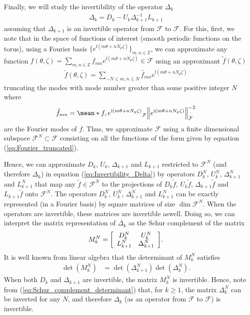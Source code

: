 Finally, we will study the invertibility of the operator $\Delta_k$ 
%
\begin{align}
	\Delta_{k} = D_k - U_k \Delta_{k+1}^{-1} L_{k+1} 
\label{eq:Invertibility_Delta}
\end{align}
assuming that $\Delta_{k+1}$ is an invertible operator from $\mathcal{F}$ to $\mathcal{F}$. For this, first, we note that in the space of functions of interest (smooth periodic functions on the torus), using a Fourier basis $\{e^{\ii (m \theta+ nN_p\zeta)}\}_{m,n\in\mathbb{Z}}$, we can approximate any function $f(\theta,\zeta)=\sum_{m,n\in \mathbb{Z}} \hat{f}_{mn} e^{\ii (m \theta+ nN_p\zeta)} \in \mathcal{F}$ using an approximant $\tilde{f}(\theta,\zeta)$
%
\begin{align}
	\tilde{f}(\theta,\zeta)=\sum_{- N \le m,n\le N } \hat{f}_{mn} e^{\ii (m \theta+ nN_p\zeta)}
\label{eq:Fourier_truncated}
\end{align}
truncating the modes with mode number greater than some positive integer $N $ where 
\begin{align}
	\hat{f}_{mn} = \mean*{f,e^{\ii (m \theta+ nN_p\zeta)}}_{\mathcal{F}}  \norm{e^{\ii (m \theta+ nN_p\zeta)}}_{\mathcal{F}}^{-2}
\end{align}
 are the Fourier modes of $f$. Thus, we approximate $\mathcal{F}$ using a finite dimensional subspace $\mathcal{F}^{N} \subset \mathcal{F}$ consisting on all the functions of the form given by equation (\ref{eq:Fourier_truncated}).
 
 
 Hence, we can approximate $D_k$, $U_k$, $\Delta_{k+1}$ and $L_{k+1} $ restricted to $\mathcal{F}^{N}$ (and therefore $\Delta_{k}$) in equation (\ref{eq:Invertibility_Delta}) by operators $D_k^N$, $U_k^N$, $\Delta_{k+1}^N$ and $L_{k+1}^N$ that map any $\tilde{f}\in\mathcal{F}^N$ to the projections of $D_k \tilde{f}$, $U_k \tilde{f}$, $\Delta_{k+1} \tilde{f}$ and $L_{k+1} \tilde{f}$ onto $\mathcal{F}^N$. The operators $D_k^N$, $U_k^N$, $\Delta_{k+1}^N$ and $L_{k+1}^N$ can be exactly represented (in a Fourier basis) by square matrices of size $\dim \mathcal{F}^N$. When the operators are invertible, these matrices are invertible aswell. Doing so, we can interpret the matrix representation of $\Delta_{k}$ as the Schur complement of the matrix
%
\begin{align}
	M_k^N = 
	\Matrix{cc}
	{ D_k^N & U_k^N \\
		L_{k+1}^N & \Delta_{k+1}^N
	}.
	\label{eq:Invertibility_Delta_Schur}
\end{align}
It is well known from linear algebra that the determinant of $M_k^N$ satisfies
%
\begin{align}
	\det(M_k^N)
	& =
	\det(\Delta_{k+1}^N)
	\det(\Delta_k^N)
	.
	\label{eq:Schur_complement_determinant}
\end{align}
%
When both $D_k$ and $\Delta_{k+1}$ are invertible, the matrix $M_k^N$ is invertible. Hence, note from (\ref{eq:Schur_complement_determinant}) that, for $k\ge1$, the matrix $\Delta_{k}^N$ can be inverted for any $N$, and therefore $\Delta_{k}$ (as an operator from $\mathcal{F}$ to $\mathcal{F}$) is invertible. 





